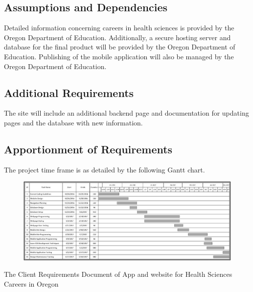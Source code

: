 \documentclass[letterpaper,10pt, draftclsnofoot,onecolumn]{IEEEtran}
\begin{document}
{{{{{\subsection[Assumptions and Dependencies]{\color{black}
Assumptions and Dependencies}
{\color{black}\normalsize\noindent
Detailed information concerning careers in health sciences is provided by the Oregon Department of Education.
Additionally, a secure hosting server and database for the final product will be provided by the Oregon Department of Education. 
Publishing of the mobile application will also be managed by the Oregon Department of Education.}



\subsection[Additional Requirements]{\color{black}
Additional Requirements}
{\color{black}\normalsize\noindent
The site will include an additional backend page and documentation for updating pages and the database with new information. } 





\subsection[Apportionment of Requirements]{\color{black}
Apportionment of Requirements}\noindent
The project time frame is as detailed by the following Gantt chart.

\begin{figure}[H]
\includegraphics[scale=0.5]{GANTTv2.JPG}
\end{figure}


 
 
 \clearpage\setcounter{page}{1}


\bigskip

{\centering{}\color{black}
The Client Requirements Document of App and website for Health Sciences Careers in Oregon
\par}


}}}}}
\end{document}
